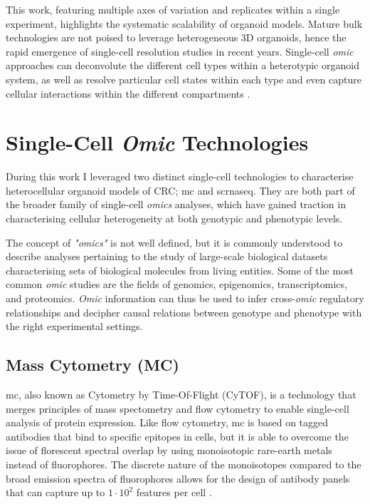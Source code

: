 This work, featuring multiple axes of variation and replicates within a single experiment, highlights the systematic scalability of organoid models. %
Mature bulk technologies are not poised to leverage heterogeneous 3D organoids, hence the rapid emergence of single-cell resolution studies in recent years. Single-cell \emph{omic} approaches can deconvolute the different cell types within a heterotypic organoid system, as well as resolve particular cell states within each type and even capture cellular interactions within the different compartments \cite{tape_heterocellular_2017}.

\newpage
\section{Single-Cell \emph{Omic} Technologies}

During this work I leveraged two distinct single-cell technologies to characterise heterocellular organoid models of CRC; \acrfull{mc} and \acrfull{scrnaseq}. They are both part of the broader family of single-cell \emph{omics} analyses, which have gained traction in characterising cellular heterogeneity at both genotypic and phenotypic levels. 

The concept of \emph{"omics"} is not well defined, but it is commonly understood to describe analyses pertaining to the study of large-scale biological datasets characterising sets of biological molecules from living entities. Some of the most common \emph{omic} studies are the fields of genomics, epigenomics, transcriptomics, and proteomics.
\emph{Omic} information can thus be used to infer cross-\emph{omic} regulatory relationships and decipher causal relations between genotype and phenotype with the right experimental settings.


\subsection{Mass Cytometry (MC)}

\acrshort{mc}, also known as Cytometry by Time-Of-Flight (CyTOF), is a technology that merges principles of mass spectometry and flow cytometry to enable single-cell analysis of protein expression. Like flow cytometry, \acrshort{mc} is based on tagged antibodies that bind to specific epitopes in cells, but it is able to overcome the issue of florescent spectral overlap by using monoisotopic rare-earth metals instead of fluorophores. The discrete nature of the monoisotopes compared to the broad emission spectra of fluorophores allows for the design of antibody panels that can capture up to \(1\cdot10^2\) features per cell \cite{tracey_cytof_2021}. 


